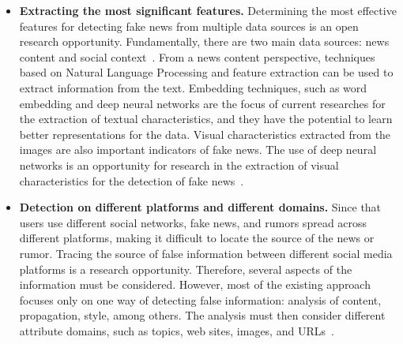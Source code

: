 \documentclass{ieeeaccess}
\begin{document}
\begin{itemize}
    \item {\bf Extracting the most significant features.} Determining the most effective features for detecting fake news from multiple data sources is an open research opportunity. Fundamentally, there are two main data sources: news content and social context~\cite{shu2017fake}. From a news content perspective, techniques based on Natural Language Processing and feature extraction can be used to extract information from the text. Embedding techniques, such as word embedding and deep neural networks are the focus of current researches for the extraction of textual characteristics, and they have the potential to learn better representations for the data. Visual characteristics extracted from the images are also important indicators of fake news. The use of deep neural networks is an opportunity for research in the extraction of visual characteristics for the detection of fake news~\cite{sharma2019combating, meel2020}.
    

    \item{\bf Detection on different platforms and different domains.} Since that users use different social networks, fake news, and rumors spread across different platforms, making it difficult to locate the source of the news or rumor. Tracing the source of false information between different social media platforms is a research opportunity. Therefore, several aspects of the information must be considered. However, most of the existing approach focuses only on one way of detecting false information: analysis of content, propagation, style, among others. The analysis must then consider different attribute domains, such as topics, web sites, images, and URLs~\cite{meel2020}.
    

\end{itemize}
\end{document}
